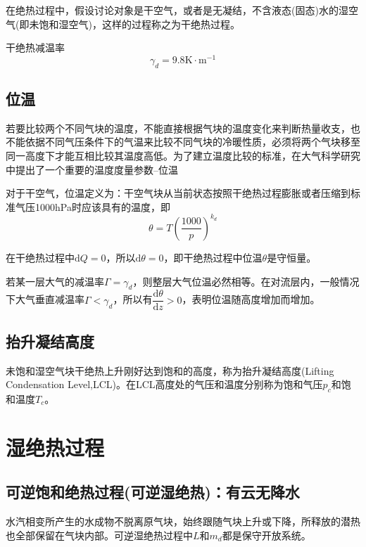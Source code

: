 \documentclass[UTF8,a4paper,11pt,oneside]{ctexbook}
\begin{document}
在绝热过程中，假设讨论对象是干空气，或者是无凝结，不含液态(固态)水的湿空气(即未饱和湿空气)，这样的过程称之为干绝热过程。

干绝热减温率
\begin{equation}
\gamma_d=9.8\mathrm{K\cdot{}m^{-1}}
\end{equation}

\subsection{位温}

若要比较两个不同气块的温度，不能直接根据气块的温度变化来判断热量收支，也不能依据不同气压条件下的气温来比较不同气块的冷暖性质，必须将两个气块移至同一高度下才能互相比较其温度高低。为了建立温度比较的标准，在大气科学研究中提出了一个重要的温度度量参数--位温

对于干空气，位温定义为：干空气块从当前状态按照干绝热过程膨胀或者压缩到标准气压1000hPa时应该具有的温度，即
\begin{equation}
\theta=T\left(\dfrac{1000}{p}\right)^{k_d}
\end{equation}

在干绝热过程中\(\mathrm{d}Q=0\)，所以\(\mathrm{d}\theta=0\)，即干绝热过程中位温\(\theta\)是守恒量。

若某一层大气的减温率\(\Gamma=\gamma_d\)，则整层大气位温必然相等。在对流层内，一般情况下大气垂直减温率\(\Gamma<\gamma_d\)，所以有\(\dfrac{\mathrm{d}\theta}{\mathrm{d}z}>0\)，表明位温随高度增加而增加。

\subsection{抬升凝结高度}
未饱和湿空气块干绝热上升刚好达到饱和的高度，称为抬升凝结高度(Lifting Condensation Level,LCL)。在LCL高度处的气压和温度分别称为饱和气压\(p_c\)和饱和温度\(T_c\)。

\section{湿绝热过程}

\subsection{可逆饱和绝热过程(可逆湿绝热)：有云无降水}

水汽相变所产生的水成物不脱离原气块，始终跟随气块上升或下降，所释放的潜热也全部保留在气块内部。可逆湿绝热过程中\(L\)和\(m_d\)都是保守开放系统。
\end{document}
